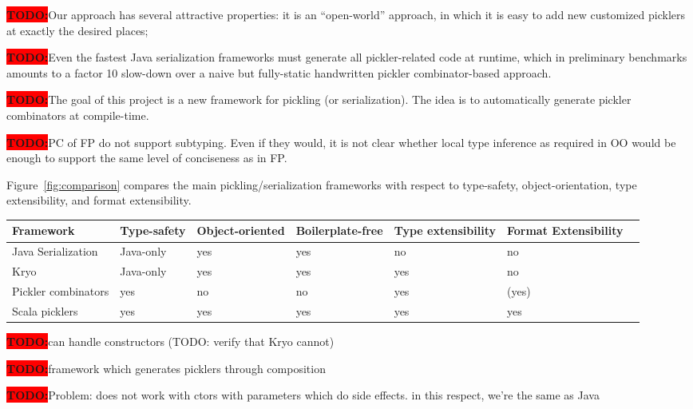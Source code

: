 \documentclass[preprint,10pt]{sigplanconf}
\theoremstyle{definition}
\newcommand{\todo}{{\bf \colorbox{red}{\color{white}TODO:}}}
\begin{document}
\todo Our approach has several attractive properties: it is an ``open-world'' approach, in which it is easy to add new customized picklers at exactly the desired places;

\todo Even the fastest Java serialization frameworks must generate all
pickler-related code at runtime, which in preliminary benchmarks
amounts to a factor 10 slow-down over a naive but fully-static handwritten pickler
combinator-based approach.

\todo The goal of this project is a new framework for pickling (or
serialization). The idea is to automatically generate pickler
combinators at compile-time.

\todo PC of FP do not support subtyping. Even if they would, it is not clear whether local type inference as required in OO would be enough to support the same level of conciseness as in FP.

Figure~\ref{fig:comparison} compares the main pickling/serialization
frameworks with respect to type-safety, object-orientation, type
extensibility, and format extensibility.

\begin{figure*}[ht!]
\centering
\begin{tabular}{|l|l|l|l|l|l|l|}
\hline
Framework           & Type-safety  & Object-oriented  & Boilerplate-free  & Type extensibility  & Format Extensibility \\
\hline
Java Serialization  & Java-only    & yes              & yes          & no                  & no \\
Kryo                & Java-only    & yes              & yes          & yes                 & no \\
Pickler combinators & yes          & no               & no           & yes                 & (yes) \\
Scala picklers      & yes          & yes              & yes          & yes                 & yes \\
\hline
\end{tabular}

\caption{Comparing serialization frameworks}\label{fig:comparison}
\end{figure*}

\todo can handle constructors (TODO: verify that Kryo cannot)

\todo framework which generates picklers through composition

\todo Problem: does not work with ctors with parameters which do side effects. in this respect, we're the same as Java
\end{document}
